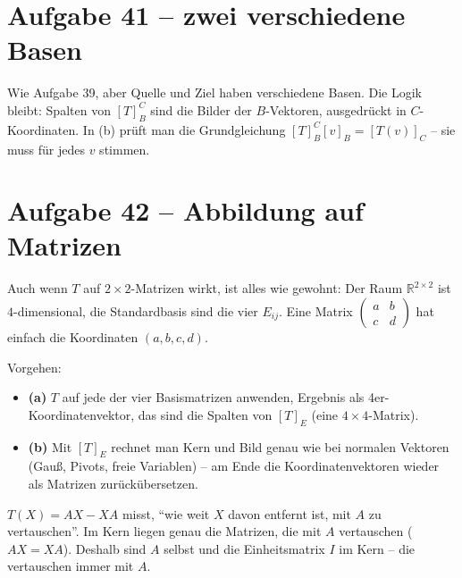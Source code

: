 \documentclass[a4paper,12pt]{article}
\begin{document}
\section*{Aufgabe 41 -- zwei verschiedene Basen}

Wie Aufgabe 39, aber Quelle und Ziel haben verschiedene Basen. Die Logik bleibt: Spalten von $[T]_B^C$ sind die Bilder der $B$-Vektoren, ausgedr\"uckt in $C$-Koordinaten. In (b) pr\"uft man die Grundgleichung $[T]_B^C [v]_B = [T(v)]_C$ -- sie muss f\"ur jedes $v$ stimmen.

\section*{Aufgabe 42 -- Abbildung auf Matrizen}

\begin{merkbox}[title={Trick}]
Auch wenn $T$ auf $2\times 2$-Matrizen wirkt, ist alles wie gewohnt: Der Raum $\mathbb{R}^{2\times 2}$ ist $4$-dimensional, die Standardbasis sind die vier $E_{ij}$. Eine Matrix $\left(\begin{smallmatrix} a & b \\ c & d \end{smallmatrix}\right)$ hat einfach die Koordinaten $(a, b, c, d)$.
\end{merkbox}

Vorgehen:
\begin{itemize}[leftmargin=*, nosep]
    \item \textbf{(a)} $T$ auf jede der vier Basismatrizen anwenden, Ergebnis als 4er-Koordinatenvektor, das sind die Spalten von $[T]_E$ (eine $4\times 4$-Matrix).
    \item \textbf{(b)} Mit $[T]_E$ rechnet man Kern und Bild genau wie bei normalen Vektoren (Gau\ss, Pivots, freie Variablen) -- am Ende die Koordinatenvektoren wieder als Matrizen zur\"uck\"ubersetzen.
\end{itemize}

\begin{analogie}
$T(X) = AX - XA$ misst, ``wie weit $X$ davon entfernt ist, mit $A$ zu vertauschen''. Im Kern liegen genau die Matrizen, die mit $A$ vertauschen ($AX = XA$). Deshalb sind $A$ selbst und die Einheitsmatrix $I$ im Kern -- die vertauschen immer mit $A$.
\end{analogie}
\end{document}
